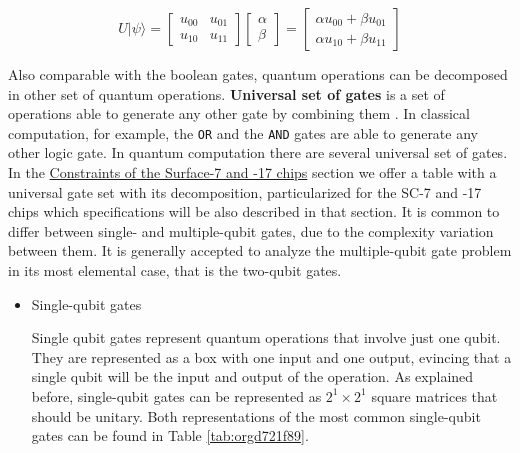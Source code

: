 \begin{itemize}
\begin{equation}
\label{eq:org305e0b8}
U |\psi\rangle=\begin{bmatrix}u_{00}&u_{01}\\u_{10}&u_{11}\end{bmatrix} \begin{bmatrix}\alpha \\ \beta \end{bmatrix} = \begin{bmatrix}\alpha u_{00} + \beta u_{01} \\ \alpha u_{10} + \beta u_{11} \end{bmatrix}
\end{equation}

Also comparable with the boolean gates, quantum operations can be decomposed in other set of quantum operations.
\textbf{Universal set of gates} is a set of operations able to generate any other gate by combining them \cite{Nielsen_2009}.
In classical computation, for example, the \texttt{OR} and the \texttt{AND} gates are able to generate any other logic gate.
In quantum computation there are several universal set of gates.
In the \href{chapter-3.org}{Constraints of the Surface-7 and -17 chips} section we offer a table with a universal gate set with its decomposition, particularized for the SC-7 and -17 chips which specifications will be also described in that section.
It is common to differ between single- and multiple-qubit gates, due to the complexity variation between them.
It is generally accepted to analyze the multiple-qubit gate problem in its most elemental case, that is the two-qubit gates.

\begin{itemize}
\item Single-qubit gates
\label{sec:org7b8541f}

Single qubit gates represent quantum operations that involve just one qubit.
They are represented as a box with one input and one output, evincing that a single qubit will be the input and output of the operation.
As explained before, single-qubit gates can be represented as \(2^1 \times 2^1\) square matrices that should be unitary.
Both representations of the most common single-qubit gates can be found in Table \ref{tab:orgd721f89}.


\end{itemize}
\end{itemize}
